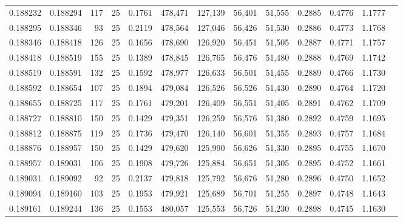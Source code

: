 \begin{tabular}{rrrrrrrrrrrrr}
0.188232 & 0.188294 &   117 &  25 &                                     0.1761 & 478,471 & 127,139 &  56,401 &  51,555 & 0.2885 & 0.4776 & 1.1777 \\
0.188295 & 0.188346 &    93 &  25 &                                     0.2119 & 478,564 & 127,046 &  56,426 &  51,530 & 0.2886 & 0.4773 & 1.1768 \\
0.188346 & 0.188418 &   126 &  25 &                                     0.1656 & 478,690 & 126,920 &  56,451 &  51,505 & 0.2887 & 0.4771 & 1.1757 \\
0.188418 & 0.188519 &   155 &  25 &                                     0.1389 & 478,845 & 126,765 &  56,476 &  51,480 & 0.2888 & 0.4769 & 1.1742 \\
0.188519 & 0.188591 &   132 &  25 &                                     0.1592 & 478,977 & 126,633 &  56,501 &  51,455 & 0.2889 & 0.4766 & 1.1730 \\
0.188592 & 0.188654 &   107 &  25 &                                     0.1894 & 479,084 & 126,526 &  56,526 &  51,430 & 0.2890 & 0.4764 & 1.1720 \\
0.188655 & 0.188725 &   117 &  25 &                                     0.1761 & 479,201 & 126,409 &  56,551 &  51,405 & 0.2891 & 0.4762 & 1.1709 \\
0.188727 & 0.188810 &   150 &  25 &                                     0.1429 & 479,351 & 126,259 &  56,576 &  51,380 & 0.2892 & 0.4759 & 1.1695 \\
0.188812 & 0.188875 &   119 &  25 &                                     0.1736 & 479,470 & 126,140 &  56,601 &  51,355 & 0.2893 & 0.4757 & 1.1684 \\
0.188876 & 0.188957 &   150 &  25 &                                     0.1429 & 479,620 & 125,990 &  56,626 &  51,330 & 0.2895 & 0.4755 & 1.1670 \\
0.188957 & 0.189031 &   106 &  25 &                                     0.1908 & 479,726 & 125,884 &  56,651 &  51,305 & 0.2895 & 0.4752 & 1.1661 \\
0.189031 & 0.189092 &    92 &  25 &                                     0.2137 & 479,818 & 125,792 &  56,676 &  51,280 & 0.2896 & 0.4750 & 1.1652 \\
0.189094 & 0.189160 &   103 &  25 &                                     0.1953 & 479,921 & 125,689 &  56,701 &  51,255 & 0.2897 & 0.4748 & 1.1643 \\
0.189161 & 0.189244 &   136 &  25 &                                     0.1553 & 480,057 & 125,553 &  56,726 &  51,230 & 0.2898 & 0.4745 & 1.1630 \\

\end{tabular}

